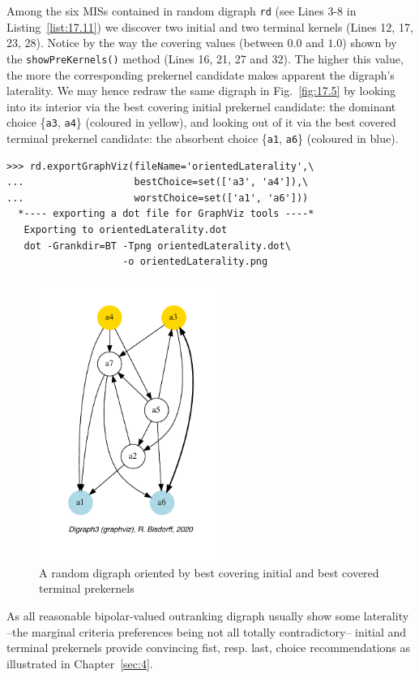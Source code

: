 Among the six MISs contained in random digraph \texttt{rd} (see Lines 3-8 in Listing~\vref{list:17.11}) we discover two initial and two terminal kernels (Lines 12, 17, 23, 28). Notice by the way the covering values (between $0.0$ and $1.0$) shown by the \texttt{showPreKernels()} method (Lines 16, 21, 27 and 32). The higher this value, the more the corresponding prekernel candidate makes apparent the digraph's laterality. We may hence redraw the same digraph in Fig.~\vref{fig:17.5} by looking into its interior via the best covering initial prekernel candidate: the dominant choice \{\texttt{a3}, \texttt{a4}\} (coloured in yellow), and looking out of it via the best covered terminal prekernel candidate: the absorbent choice \{\texttt{a1}, \texttt{a6}\} (coloured in blue).
\begin{lstlisting}
>>> rd.exportGraphViz(fileName='orientedLaterality',\
...                   bestChoice=set(['a3', 'a4']),\
...                   worstChoice=set(['a1', 'a6']))
  *---- exporting a dot file for GraphViz tools ----*
   Exporting to orientedLaterality.dot
   dot -Grankdir=BT -Tpng orientedLaterality.dot\
                    -o orientedLaterality.png
\end{lstlisting}
\begin{figure}[ht]
\sidecaption[t]
\includegraphics[width=6cm]{Figures/17-5-orientedLaterality.pdf}
\caption{A random digraph oriented by best covering initial and
   best covered terminal prekernels}
\label{fig:17.5}       %
\end{figure}

As all reasonable bipolar-valued outranking digraph usually show some laterality --the marginal criteria preferences being not all totally contradictory-- initial and terminal prekernels provide convincing fist, resp. last, choice recommendations as illustrated in Chapter~\vref{sec:4}.

